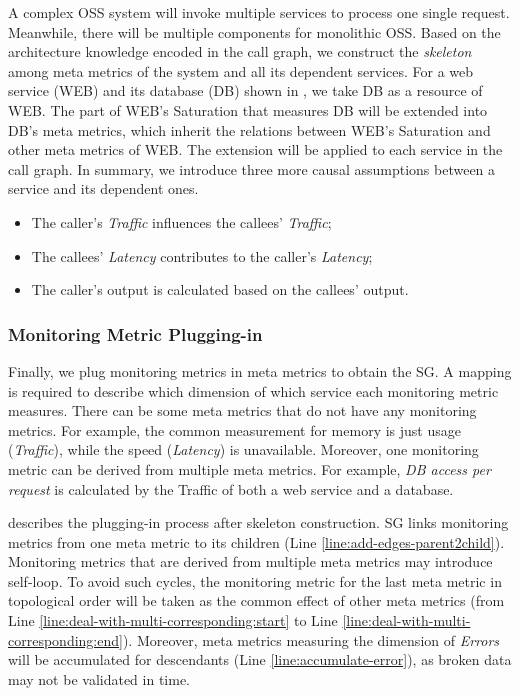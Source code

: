 A complex OSS system will invoke multiple services to process one single request.
Meanwhile, there will be multiple components for monolithic OSS.
Based on the architecture knowledge encoded in the call graph, we construct the \textit{skeleton} among meta metrics of the system and all its dependent services.
For a web service (WEB) and its database (DB) shown in , we take DB as a resource of WEB.
The part of WEB's Saturation that measures DB will be extended into DB's meta metrics, which inherit the relations between WEB's Saturation and other meta metrics of WEB.
The extension will be applied to each service in the call graph.
In summary, we introduce three more causal assumptions between a service and its dependent ones.

\begin{itemize}
	\item The caller's \textit{Traffic} influences the callees' \textit{Traffic};
	\item The callees' \textit{Latency} contributes to the caller's \textit{Latency};
	\item The caller's output is calculated based on the callees' output.
\end{itemize}

\subsubsection{Monitoring Metric Plugging-in}

Finally, we plug monitoring metrics in meta metrics to obtain the SG.
A mapping is required to describe which dimension of which service each monitoring metric measures.
There can be some meta metrics that do not have any monitoring metrics.
For example, the common measurement for memory is just usage (\textit{Traffic}), while the speed (\textit{Latency}) is unavailable.
Moreover, one monitoring metric can be derived from multiple meta metrics.
For example, \textit{DB access per request} is calculated by the Traffic of both a web service and a database.

 describes the plugging-in process after skeleton construction.
SG links monitoring metrics from one meta metric to its children (Line \ref{line:add-edges-parent2child}).
Monitoring metrics that are derived from multiple meta metrics may introduce self-loop.
To avoid such cycles, the monitoring metric for the last meta metric in topological order will be taken as the common effect of other meta metrics (from Line \ref{line:deal-with-multi-corresponding:start} to Line \ref{line:deal-with-multi-corresponding:end}).
Moreover, meta metrics measuring the dimension of \textit{Errors} will be accumulated for descendants (Line \ref{line:accumulate-error}), as broken data may not be validated in time.

